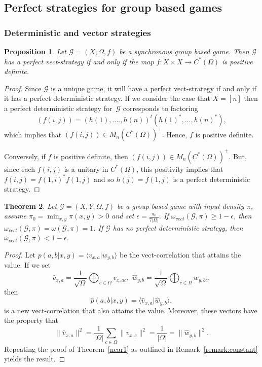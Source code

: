 \documentclass[11pt]{amsart}
\newtheorem{thm}{Theorem}[section]
\newtheorem{prop}[thm]{Proposition}
\theoremstyle{definition}
\newcommand{\cl}[1]{\mathcal{#1}}
\begin{document}
\subsection{Perfect strategies for group based games}
\subsubsection{Deterministic and vector strategies}

 \begin{prop} Let $\cl G= (X, \Omega, f)$ be a synchronous group based game.  Then $\cl G$ has a perfect vect-strategy if and only if the map $f:X \times X \to C^*(\Omega)$ is positive definite.
 \end{prop}
  \begin{proof} Since $\cl G$ is a unique game, it will have a perfect vect-strategy if and only if it has a perfect deterministic strategy.
 If we consider the case that $X= [n]$ then a perfect deterministic strategy for~$\cl G$ corresponds to factoring
 \[ (f(i,j)) = (h(1),....,h(n))^t(h(1)^*,...,h(n)^*),\]
 which implies that $(f(i,j)) \in M_n(C^*(\Omega))^+.$ Hence, $f$ is positive definite.

 Conversely, if $f$ is positive definite, then $(f(i,j)) \in M_n(C^*(\Omega))^+.$ But, since each $f(i,j)$ is a unitary in $C^*(\Omega)$, this positivity implies that
 $f(i,j) = f(1,i)^* f(1,j)$ and so $h(j) = f(1,j)$ is a perfect deterministic strategy.
 \end{proof}

\begin{thm}
   Let $\mathcal{G}=(X, Y, \Omega, f)$ be a group based game with input density $\pi$, assume
   $\pi_0=\min_{x,y}\pi(x,y)>0$ and set $\epsilon= \frac{\pi_0}{7|\Omega|}$. If $\omega_{vect}(\mathcal{G},\pi)\ge 1- \epsilon$, then $\omega_{vect}(\cl G, \pi) = \omega(\cl G, \pi) =1$. If $\mathcal{G}$ has no perfect deterministic strategy, then
   $\omega_{vect}(\cl G, \pi) <1-\epsilon$.
 \end{thm}
\begin{proof} Let $p(a,b | x,y) = \langle v_{x,a} \vert w_{y,b} \rangle$ be the vect-correlation that attains the value.
If we set
\[ \hat{v}_{x,a} = \frac{1}{\sqrt{\Omega}} \bigoplus_{c \in \Omega} v_{x,ac}, \,\, \hat{w}_{y,b} = \frac{1}{\sqrt{\Omega}} \bigoplus_{c \in \Omega} w_{y, bc},\]
then
\[ \hat{p}(a, b | x, y) = \langle \hat{v}_{x,a} \vert \hat{w}_{y,b} \rangle,\]
is a new vect-correlation that also attains the value.  Moreover, these vectors have the property that
\[ \| \hat{v}_{x,a} \|^2 = \frac{1}{|\Omega|}\sum_{c \in \Omega} \|v_{x,c}\|^2 = \frac{1}{|\Omega|}= \|\hat{w}_{y,b} \|^2.\]
Repeating the proof of Theorem~\ref{near1} as outlined in Remark~\ref{remark:constant} yields the result.
\end{proof}
\end{document}
